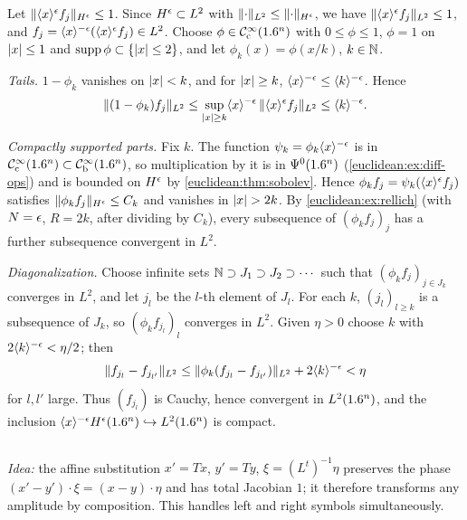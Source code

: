 Let $\lVert \langle x\rangle^\epsilon f_j\rVert_{H^\epsilon}\le1$. Since $H^\epsilon\subset L^2$ with
$\lVert \cdot\rVert_{L^2}\le\lVert \cdot\rVert_{H^\epsilon}$, we have $\lVert \langle x\rangle^\epsilon f_j\rVert_{L^2}\le1$, and
$f_j=\langle x\rangle^{-\epsilon}(\langle x\rangle^\epsilon f_j)\in L^2$. Choose $\phi\in\mathcal{C}^\infty_{\mathrm{c}}(1.6^n)$ with
$0\le\phi\le1$, $\phi=1$ on $\lvert x\rvert\le1$ and $\operatorname{supp}\phi\subset\{\lvert x\rvert\le2\}$, and let
$\phi_k(x)=\phi(x/k)$, $k\in\mathbb{N}$.

\emph{Tails.} $1-\phi_k$ vanishes on $\lvert x\rvert<k$, and for $\lvert x\rvert\ge k$,
$\langle x\rangle^{-\epsilon}\le\langle k\rangle^{-\epsilon}$. Hence
\begin{equation*}
  \lVert (1-\phi_k)f_j\rVert_{L^2}\le\sup_{\lvert x\rvert\ge k}\langle x\rangle^{-\epsilon}\,\lVert \langle x\rangle^\epsilon f_j\rVert_{L^2}
  \le\langle k\rangle^{-\epsilon}.
\end{equation*}

\emph{Compactly supported parts.} Fix $k$. The function
$\psi_k=\phi_k\langle x\rangle^{-\epsilon}$ is in $\mathcal{C}^\infty_{\mathrm{c}}(1.6^n)\subset\mathcal{C}^\infty_{\mathrm{b}}(1.6^n)$, so multiplication by it
is in $\Psi^{0}(1.6^n)$ (\cref{euclidean:ex:diff-ops}) and is bounded on $H^\epsilon$ by
\cref{euclidean:thm:sobolev}. Hence $\phi_kf_j=\psi_k(\langle x\rangle^\epsilon f_j)$ satisfies
$\lVert \phi_kf_j\rVert_{H^\epsilon}\le C_k$ and vanishes in $\lvert x\rvert>2k$. By
\cref{euclidean:ex:rellich} (with $N=\epsilon$, $R=2k$, after dividing by $C_k$), every
subsequence of $(\phi_kf_j)_j$ has a further subsequence convergent in $L^2$.

\emph{Diagonalization.} Choose infinite sets $\mathbb{N}\supset J_1\supset J_2\supset\cdots$ such
that $(\phi_kf_j)_{j\in J_k}$ converges in $L^2$, and let $j_l$ be the $l$-th element of
$J_l$. For each $k$, $(j_l)_{l\ge k}$ is a subsequence of $J_k$, so $(\phi_kf_{j_l})_l$
converges in $L^2$. Given $\eta>0$ choose $k$ with $2\langle k\rangle^{-\epsilon}<\eta/2$; then
\begin{equation*}
  \lVert f_{j_l}-f_{j_{l'}}\rVert_{L^2}\le\lVert \phi_k(f_{j_l}-f_{j_{l'}})\rVert_{L^2}+2\langle k\rangle^{-\epsilon}<\eta
\end{equation*}
for $l,l'$ large. Thus $(f_{j_l})$ is Cauchy, hence convergent in $L^2(1.6^n)$, and the
inclusion $\langle x\rangle^{-\epsilon}H^\epsilon(1.6^n)\hookrightarrow L^2(1.6^n)$ is compact.

\subsection*{}

\emph{Idea:} the affine substitution $x'=Tx$, $y'=Ty$, $\xi=(L^t)^{-1}\eta$ preserves the
phase $(x'-y')\cdot\xi=(x-y)\cdot\eta$ and has total Jacobian $1$; it therefore transforms
any amplitude by composition. This handles left and right symbols simultaneously.

